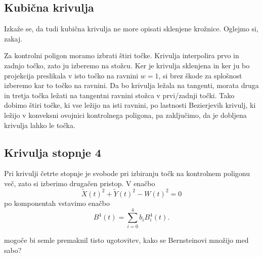 \documentclass[a4paper,12pt]{article}
\begin{document}
\subsection{Kubična krivulja}
Izkaže se, da tudi kubična krivulja ne more opisati sklenjene krožnice. Oglejmo si, zakaj.

Za kontrolni poligon moramo izbrati štiri točke. Krivulja interpolira prvo in zadnjo točko, zato ju izberemo na stožcu. Ker je krivulja sklenjena in ker ju bo projekcija preslikala v isto točko na ravnini $w=1$, si brez škode za splošnost izberemo kar to točko na ravnini. Da bo krivulja ležala na tangenti, morata druga in tretja točka ležati na tangentni ravnini stožca v prvi/zadnji točki. Tako dobimo štiri točke, ki vse ležijo na isti ravnini, po lastnosti Bezierjevih krivulj, ki ležijo v konveksni ovojnici kontrolnega poligona, pa zaključimo, da je dobljena krivulja lahko le točka.

\subsection{Krivulja stopnje 4}
Pri krivulji četrte stopnje je svobode pri izbiranju točk na kontrolnem poligonu več, zato si izberimo drugačen pristop. V enačbo $$\tilde{X}(t)^2 + \tilde{Y}(t)^2 - W(t)^2 = 0$$ po komponentah vstavimo enačbo $$B^4(t) = \sum_{i=0}^4b_iB_i^4(t).$$

mogoče bi semle premaknil tisto ugotovitev, kako se Bernsteinovi množijo med sabo?
\end{document}
